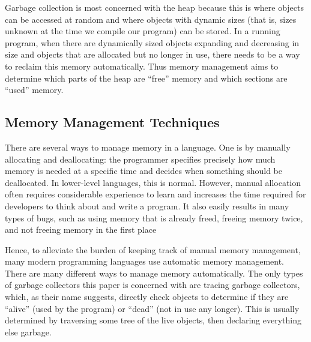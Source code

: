 \documentclass[index]{subfiles}
\begin{document}



Garbage collection is most concerned with the heap because this is where objects can be accessed at random and where objects with dynamic sizes (that is, sizes unknown at the time we compile our program) can be stored. In a running program, when there are dynamically sized objects expanding and decreasing in size and objects that are allocated but no longer in use, there needs to be a way to reclaim this memory automatically. Thus memory management aims to determine which parts of the heap are ``free'' memory and which sections are ``used'' memory.

\subsection{Memory Management Techniques}

There are several ways to manage memory in a language. One is by manually allocating and deallocating: the programmer specifies precisely how much memory is needed at a specific time and decides when something should be deallocated. In lower-level languages, this is normal. However, manual allocation often requires considerable experience to learn and increases the time required for developers to think about and write a program. It also easily results in many types of bugs, such as using memory that is already freed, freeing memory twice, and not freeing memory in the first place \cites{garbage_collection_overview_uw}[Chapter~1]{gc_handbook}

Hence, to alleviate the burden of keeping track of manual memory management, many modern programming languages use automatic memory management. There are many different ways to manage memory automatically. The only types of garbage collectors this paper is concerned with are tracing garbage collectors, which, as their name suggests, directly check objects to determine if they are ``alive'' (used by the program) or ``dead'' (not in use any longer)\cite{a_unified_theory_of_garbage_collection}. This is usually determined by traversing some tree of the live objects\cite[Chapter~1]{gc_handbook}, then declaring everything else garbage.
\end{document}
